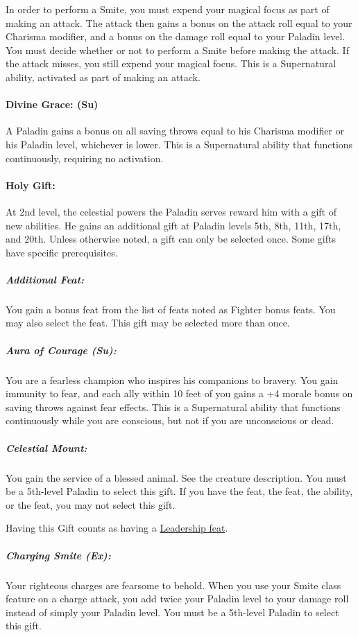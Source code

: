 In order to perform a Smite, you must expend your magical focus as part of making an attack.
The attack then gains a bonus on the attack roll equal to your Charisma modifier, and a bonus on the damage roll equal to your Paladin level.
You must decide whether or not to perform a Smite before making the attack. 
If the attack misses, you still expend your magical focus.
This is a Supernatural ability, activated as part of making an attack.

\paragraph{Divine Grace: (Su)} A Paladin gains a bonus on all saving throws equal to his Charisma modifier or his Paladin level, whichever is lower.
This is a Supernatural ability that functions continuously, requiring no activation.

\paragraph{Holy Gift:}
At 2nd level, the celestial powers the Paladin serves reward him with a gift of new abilities. He gains an additional gift at Paladin levels 5th, 8th, 11th, 17th, and 20th. Unless otherwise noted, a gift can only be selected once. Some gifts have specific prerequisites.

\subparagraph{Additional Feat:}
You gain a bonus feat from the list of feats noted as Fighter bonus feats. You may also select the  feat.
This gift may be selected more than once.

\subparagraph{Aura of Courage (Su):}
You are a fearless champion who inspires his companions to bravery.
You gain immunity to fear, and each ally within 10 feet of you gains a +4 morale bonus on saving throws against fear effects.
This is a Supernatural ability that functions continuously while you are conscious, but not if you are unconscious or dead.

\subparagraph[Celestial Mount]{Celestial Mount:}
\label{sec:CelestialMountListing}
You gain the service of a blessed animal. See the  creature description. You must be a 5th-level Paladin to select this gift. If you have the  feat, the  feat, the  ability, or the  feat, you may not select this gift.

Having this Gift counts as having a \hyperref[sec:LeadershipFeats]{Leadership feat}.
\subparagraph{Charging Smite (Ex):}
Your righteous charges are fearsome to behold. When you use your Smite class feature on a charge attack, you add twice your Paladin level to your damage roll instead of simply your Paladin level. You must be a 5th-level Paladin to select this gift.

